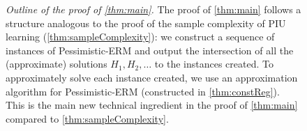 \documentclass[11pt]{article}
\theoremstyle{plain}
\theoremstyle{definition}
\theoremstyle{remark}
\newcommand{\pERM}{Pessimistic-ERM}
\begin{document}
\begin{figure}[h!]
\begin{tikzpicture}[node distance=2.5cm, scale=0.83, transform shape]
        \end{tikzpicture}
        \caption{\textit{Outline of the proof of \cref{thm:main}.} 
        The proof of \cref{thm:main} follows a structure analogous to the proof of the sample complexity of PIU learning (\cref{thm:sampleComplexity}): 
        we construct a sequence of instances of \pERM{} and output the intersection of all the (approximate) solutions $H_1,H_2,\dots$ to the instances created.
        To approximately solve each instance created, we use an approximation algorithm for \pERM{} (constructed in \cref{thm:constReg}).
        This is the main new technical ingredient in the proof of \cref{thm:main} compared to \cref{thm:sampleComplexity}.
        }
        \label{fig:outline:compComplexity}
    \end{figure}
\end{document}
